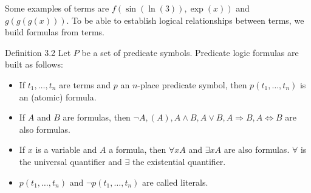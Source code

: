 \documentclass[10pt]{book}
\begin{document}
Some examples of terms are $f(\sin (\ln (3)), \exp (x))$ and $g(g(g(x)))$. To be able to establish logical relationships between terms, we build formulas from terms.

Definition 3.2 Let $P$ be a set of predicate symbols. Predicate logic formulas are built as follows:

\begin{itemize}
  \item If $t_{1}, \ldots, t_{n}$ are terms and $p$ an $n$-place predicate symbol, then $p\left(t_{1}, \ldots, t_{n}\right)$ is an (atomic) formula.
  \item If $A$ and $B$ are formulas, then $\neg A,(A), A \wedge B, A \vee B, A \Rightarrow B, A \Leftrightarrow B$ are also formulas.
  \item If $x$ is a variable and $A$ a formula, then $\forall x A$ and $\exists x A$ are also formulas. $\forall$ is the universal quantifier and $\exists$ the existential quantifier.
  \item $p\left(t_{1}, \ldots, t_{n}\right)$ and $\neg p\left(t_{1}, \ldots, t_{n}\right)$ are called literals.
\end{itemize}
\end{document}
